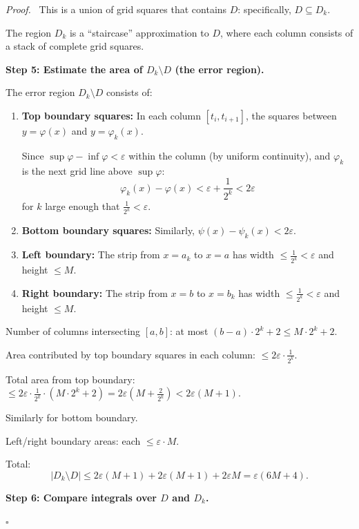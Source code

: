 \documentclass[11pt]{report}
\renewenvironment{proof}[1][Proof]{\par\noindent\textit{#1.}\ }{\hfill$\square$\par\medskip}
\begin{document}
\begin{proof}
This is a union of grid squares that contains $D$: specifically, $D \subseteq D_k$.

The region $D_k$ is a ``staircase'' approximation to $D$, where each column consists of a stack of complete grid squares.

\textbf{Step 5: Estimate the area of $D_k \setminus D$ (the error region).}

The error region $D_k \setminus D$ consists of:
\begin{enumerate}
    \item \textbf{Top boundary squares:} In each column $[t_i, t_{i+1}]$, the squares between $y = \varphi(x)$ and $y = \varphi_k(x)$.
    
    Since $\sup \varphi - \inf \varphi < \varepsilon$ within the column (by uniform continuity), and $\varphi_k$ is the next grid line above $\sup \varphi$:
    \[
    \varphi_k(x) - \varphi(x) < \varepsilon + \frac{1}{2^k} < 2\varepsilon
    \]
    for $k$ large enough that $\frac{1}{2^k} < \varepsilon$.
    
    \item \textbf{Bottom boundary squares:} Similarly, $\psi(x) - \psi_k(x) < 2\varepsilon$.
    
    \item \textbf{Left boundary:} The strip from $x = a_k$ to $x = a$ has width $\leq \frac{1}{2^k} < \varepsilon$ and height $\leq M$.
    
    \item \textbf{Right boundary:} The strip from $x = b$ to $x = b_k$ has width $\leq \frac{1}{2^k} < \varepsilon$ and height $\leq M$.
\end{enumerate}

Number of columns intersecting $[a, b]$: at most $(b - a) \cdot 2^k + 2 \leq M \cdot 2^k + 2$.

Area contributed by top boundary squares in each column: $\leq 2\varepsilon \cdot \frac{1}{2^k}$.

Total area from top boundary: $\leq 2\varepsilon \cdot \frac{1}{2^k} \cdot (M \cdot 2^k + 2) = 2\varepsilon(M + \frac{2}{2^k}) < 2\varepsilon(M + 1)$.

Similarly for bottom boundary.

Left/right boundary areas: each $\leq \varepsilon \cdot M$.

Total:
\[
|D_k \setminus D| \leq 2\varepsilon(M+1) + 2\varepsilon(M+1) + 2\varepsilon M = \varepsilon(6M + 4).
\]

\textbf{Step 6: Compare integrals over $D$ and $D_k$.}


\end{proof}
\end{document}
